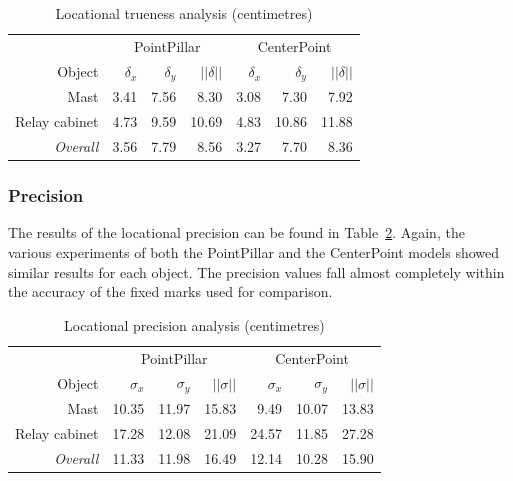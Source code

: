 \begin{table}[ht]
    \centering
    \begin{tabular}{rrrrrrr}
        \toprule
        & \multicolumn{3}{c}{PointPillar} & \multicolumn{3}{c}{CenterPoint}\\
        \cmidrule(lr){2-4} \cmidrule(lr){5-7}
        Object & $\delta_x$ & $\delta_y$ & $||\delta||$ & $\delta_x$ & $\delta_y$ & $||\delta||$ \\
        \midrule
        Mast & 3.41 & 7.56 & 8.30 & 3.08 & 7.30 & 7.92 \\
        Relay cabinet & 4.73 & 9.59 & 10.69 & 4.83 & 10.86 & 11.88 \\
        \midrule
        \textit{Overall} & 3.56 & 7.79 & 8.56 & 3.27 & 7.70 & 8.36 \\
        \bottomrule
    \end{tabular}
    \caption{Locational trueness analysis (centimetres)} %
    \label{tbl:objdet:trueness}
\end{table}

\subsubsection{Precision}
The results of the locational precision can be found in Table~\ref{tbl:objdet:locpre}. Again, the various experiments of both the PointPillar and the CenterPoint models showed similar results for each object. The precision values fall almost completely within the accuracy of the fixed marks used for comparison. 

\begin{table}[ht]
    \centering
    \begin{tabular}{rrrrrrr}
        \toprule
        & \multicolumn{3}{c}{PointPillar} & \multicolumn{3}{c}{CenterPoint}\\
        \cmidrule(lr){2-4} \cmidrule(lr){5-7}
        Object & $\sigma_x$ & $\sigma_y$ & $||\sigma||$ & $\sigma_x$ & $\sigma_y$ & $||\sigma||$\\
        \midrule
        Mast & 10.35 & 11.97 & 15.83 & 9.49 & 10.07 & 13.83 \\
        Relay cabinet & 17.28 & 12.08 & 21.09 & 24.57 & 11.85 & 27.28 \\
        \midrule
        \textit{Overall} & 11.33 & 11.98 & 16.49 & 12.14 & 10.28 & 15.90 \\
        \bottomrule
    \end{tabular}
    \caption{Locational precision analysis (centimetres)} %
    \label{tbl:objdet:locpre}
\end{table}

